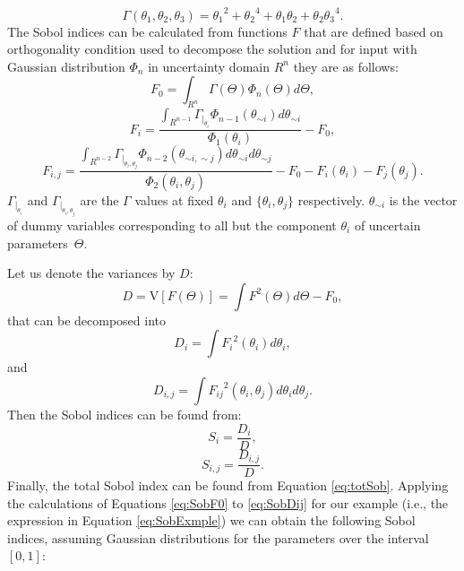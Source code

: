 \begin{equation}
\Gamma(\theta_1,\theta_2,\theta_3) =
{\theta_1}^2+{\theta_2}^4+{\theta_1}{\theta_2}+{\theta_2}{\theta_3}^4.
\label{eq:SobExmple}\end{equation} The Sobol indices can be calculated from
functions $F$ that are defined based on orthogonality condition used to
decompose the solution and for input with Gaussian distribution $\Phi_n$ in
uncertainty domain $R^n$ they are as follows:
\begin{equation}
F_0=\int_{R^n}\Gamma(\Theta) \Phi_n(\Theta) d\Theta,
\label{eq:SobF0}\end{equation}
\begin{equation}
F_i=\frac{\int_{R^{n-1}}\Gamma_{|_{\theta_i}}
\Phi_{n-1}(\theta_{\sim i}) d\theta_{\sim i}}{\Phi_{1}(\theta_i)} - F_0,
\label{eq:SobFi}\end{equation}
\begin{equation}
F_{i,j}=\frac{\int_{R^{n-2}}\Gamma_{|_{\theta_i,\theta_j}}
\Phi_{n-2}(\theta_{\sim i,\sim j}) d\theta_{\sim i} d\theta_{\sim
j}}{\Phi_{2}(\theta_i,\theta_j)}-F_0-F_i(\theta_i)-F_j(\theta_j).
\label{eq:SobFij}\end{equation} $\Gamma_{|_{\theta_i}}$ and
$\Gamma_{|_{\theta_i,\theta_j}}$ are the $\Gamma$ values at fixed $\theta_i$ and
$\{\theta_i,\theta_j\}$ respectively. $\theta_{\sim i}$ is the vector of dummy
variables corresponding to all but the component $\theta_i$ of uncertain
parameters~$\Theta$.

Let us denote the variances by $D$:
\begin{equation}
D=\mbox{V}[F(\Theta)]=\int F^2(\Theta) d\Theta-F_0,
\label{eq:SobD}\end{equation} that can be decomposed into 
\begin{equation}
D_i=\int{F_i}^2(\theta_i) d\theta_i,
\label{eq:SobDi}\end{equation} and
\begin{equation} 
D_{i,j}=\int{F_{ij}}^2(\theta_{i},\theta_{j}) d\theta_{i}d\theta_{j}.
\label{eq:SobDij}\end{equation} Then the Sobol indices can be found from:
\begin{equation} 
S_i=\frac{D_i}{D},
\label{eq:SiDi}\end{equation}
\begin{equation} 
S_{i,j}=\frac{D_{i,j}}{D}.
\label{eq:SijDij}\end{equation} Finally, the total Sobol index can be found
from Equation \ref{eq:totSob}. Applying the calculations of Equations
\ref{eq:SobF0} to \ref{eq:SobDij} for our example (i.e., the expression in
Equation \ref{eq:SobExmple}) we can obtain the following Sobol
indices,
assuming Gaussian distributions for the parameters over the interval $[0,1]$:

